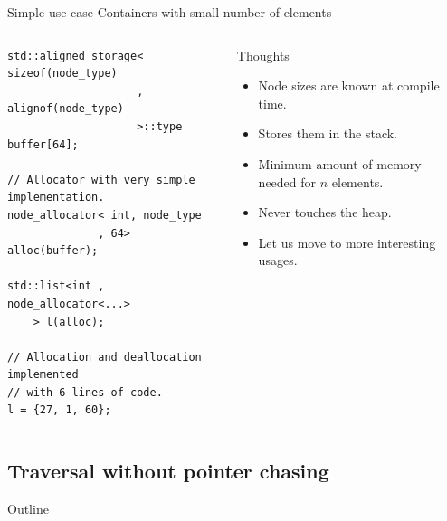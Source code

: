 \documentclass[10pt,aspectratio=169]{beamer}
\begin{document}
\begin{frame}[fragile]
{Simple use case}
{Containers with small number of elements}

\begin{columns}
\begin{column}[t]{0.47\textwidth}
\begin{lstlisting}
std::aligned_storage< sizeof(node_type)
                    , alignof(node_type)
                    >::type buffer[64];

// Allocator with very simple implementation.
node_allocator< int, node_type
              , 64> alloc(buffer);

std::list<int , node_allocator<...>
    > l(alloc);

// Allocation and deallocation implemented
// with 6 lines of code.
l = {27, 1, 60};
\end{lstlisting}
\end{column}
\begin{column}[t]{0.47\textwidth}
\begin{block}{Thoughts}
\begin{itemize}
\item Node sizes are known at compile time.
\item Stores them in the stack.
\item Minimum amount of memory needed for $n$ elements.
\item Never touches the heap.
\item {\color{alertc}Let us move to more interesting usages.}
\end{itemize}
\end{block}
\end{column}
\end{columns}
\end{frame}

\subsection{Traversal without pointer chasing}

\begin{frame}{Outline}
\end{frame}
\end{document}
